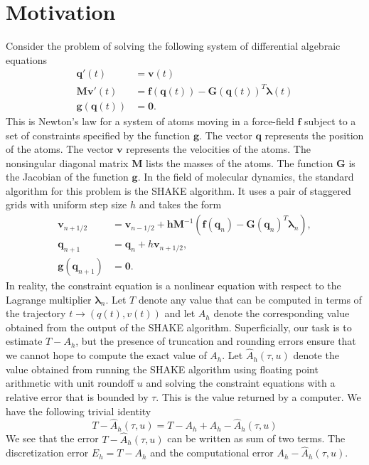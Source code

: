 \documentclass[runningheads]{llncs}
\begin{document}
\section{Motivation} Consider the problem of solving the following system of differential algebraic equations
\begin{align}
  \bm{q}'(t) &= \bm{v}(t) \\
  \bm{M}\bm{v}'(t) &= \bm{f}(\bm{q}(t)) - \bm{G}(\bm{q}(t))^T\bm{\lambda}(t) \\
  \bm{g}(\bm{q}(t)) &= \bm{0}. 
\end{align}
This is Newton's law for a system of atoms moving in a force-field $\bm{f}$ subject to a set of constraints specified by the function $\bm{g}$.
The vector $\bm{q}$ represents the position of the atoms.
The vector $\bm{v}$ represents the velocities of the atoms.
The nonsingular diagonal matrix $\bm{M}$ lists the masses of the atoms.
The function $\bm{G}$ is the Jacobian of the function $\bm{g}$.
In the field of molecular dynamics, the standard algorithm for this problem is the SHAKE algorithm.
It uses a pair of staggered grids with uniform step size $h$ and takes the form
\begin{align}
  \bm{v}_{n+1/2} &= \bm{v}_{n-1/2} + \bm{h} \bm{M}^{-1} \left( \bm{f}(\bm{q}_n) - \bm{G}(\bm{q}_n)^T \bm{\lambda}_n \right), \\
  \bm{q}_{n+1} &= \bm{q}_n + h \bm{v}_{n + 1/2}, \\
  \bm{g}(\bm{q}_{n+1}) &= \bm{0}.
\end{align}
In reality, the constraint equation is a nonlinear equation with respect to the Lagrange multiplier $\bm{\lambda}_n$. 
Let $T$ denote any value that can be computed in terms of the trajectory $t \rightarrow (q(t), v(t))$ and let $A_h$ denote the corresponding value obtained from the output of the SHAKE algorithm.
Superficially, our task is to estimate $T - A_h$, but the presence of truncation and rounding errors ensure that we cannot hope to compute the exact value of $A_h$. 
Let $\hat{A}_h(\tau,u)$ denote the value obtained from running the SHAKE algorithm using floating point arithmetic with unit roundoff $u$ and solving the constraint equations with a relative error that is bounded by $\tau$.
This is the value returned by a computer. 
We have the following trivial identity
\begin{equation}
  T - \hat{A}_h(\tau,u) = T - A_h + A_h - \hat{A}_h(\tau,u)
\end{equation}
We see that the error $T-\hat{A}_h(\tau,u)$ can be written as sum of two terms.
The discretization error $E_h = T - A_h$ and the computational error $A_h - \hat{A}_h(\tau,u)$.
\end{document}
